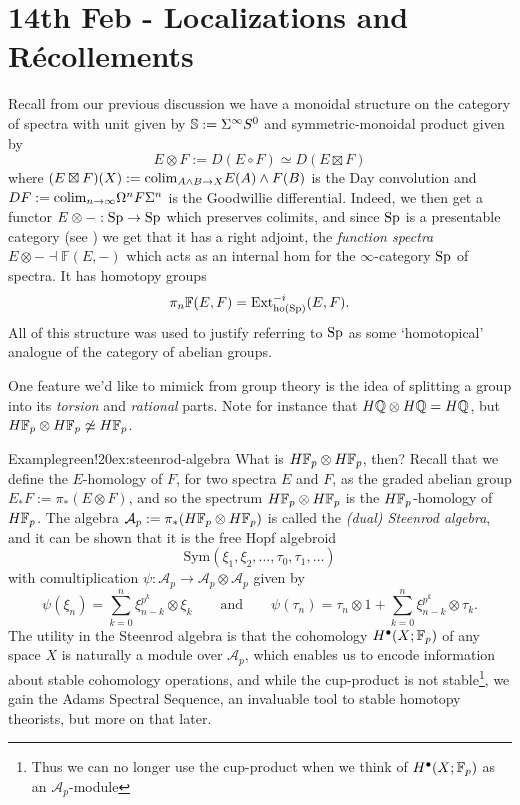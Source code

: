 \newpage 
\section{14th Feb - Localizations and R\'ecollements } 

Recall from our previous discussion we have a monoidal structure on the category of spectra with unit given by $\S := \Sigma^\infty S^0$ and symmetric-monoidal product given by
	\[
	E \otimes F 
	:= D(E \circ F)
	\simeq D(E \boxtimes F)
	\]
	where $(E \boxtimes F)(X) := \colim_{A \wedge B \to X} E(A) \wedge F(B)$ is the Day convolution and $DF := \colim_{n\to\infty} \Omega^n F \Sigma^n$ is the Goodwillie differential. Indeed, we then get a functor $E\otimes-:\Sp\to\Sp$ which preserves colimits, and since $\Sp$ is a presentable category (see \cite{HA}) we get that it has a right adjoint, the \textit{function spectra} $E\otimes- \dashv \mathbb{F}(E,-)$ which acts as an internal hom for the $\infty$-category $\Sp$ of spectra. It has homotopy groups
	\[
	\pi_n \mathbb{F}(E,F) 
	= \text{Ext}^{-i}_{\text{ho}(\Sp)}(E, F).
	\]
All of this structure was used to justify referring to $\Sp$ as some `homotopical' analogue of the category of abelian groups. 

One feature we'd like to mimick from group theory is the idea of splitting a group into its \textit{torsion} and \textit{rational} parts. Note for instance that $H\Q \otimes H\Q = H\Q$, but $H\F_p \otimes H\F_p \not\simeq H\F_p$. 

\begin{env}{Example}{green!20}{ex:steenrod-algebra}
	What is $H\F_p \otimes H\F_p$, then? Recall that we define the $E$-homology of $F$, for two spectra $E$ and $F$, as the graded abelian group $E_\ast F := \pi_\ast(E \otimes F)$, and so the spectrum $H\F_p \otimes H\F_p$ is the $H\F_p$-homology of $H\F_p$. The algebra $\mathcal{A}_p := \pi_\ast(H\F_p \otimes H\F_p)$ is called the \textit{(dual) Steenrod algebra}, and it can be shown that it is the free Hopf algebroid 
	\[
	\text{Sym}(\xi_1,\xi_2,\dots,\tau_0,\tau_1,\dots)
	\]
with comultiplication $\psi : \mathcal{A}_p \to \mathcal{A}_p\otimes\mathcal{A}_p$ given by
	\[
	\psi(\xi_n) = \sum_{k=0}^n \xi_{n-k}^{p^k} \otimes \xi_k
	\qquad\text{and}\qquad 
	\psi(\tau_n) = \tau_n\otimes1 + \sum_{k=0}^n \xi_{n-k}^{p^k} \otimes \tau_k.
	\]
The utility in the Steenrod algebra is that the cohomology $H^\bullet(X;\F_p)$ of any space $X$ is naturally a module over $\mathcal{A}_p$, which enables us to encode information about stable cohomology operations, and while the cup-product is not stable\footnote{Thus we can no longer use the cup-product when we think of $H^\bullet(X;\F_p)$ as an $\mathcal{A}_p$-module}, we gain the Adams Spectral Sequence, an invaluable tool to stable homotopy theorists, but more on that later. 
\end{env}

